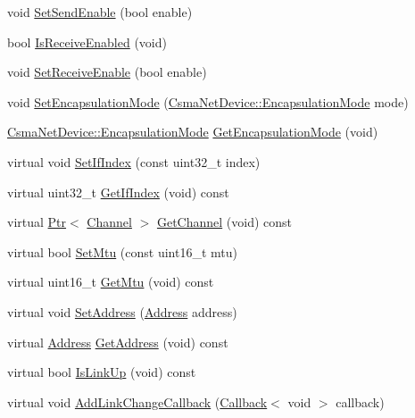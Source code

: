 \begin{DoxyCompactItemize}
\item 
void \hyperlink{classns3_1_1CsmaNetDevice_aa3a93694ca83a26f513008a7d8f36dbe}{Set\+Send\+Enable} (bool enable)
\item 
bool \hyperlink{classns3_1_1CsmaNetDevice_a6a4e8e37d1a78fa176184a1787b47c3a}{Is\+Receive\+Enabled} (void)
\item 
void \hyperlink{classns3_1_1CsmaNetDevice_a2bb51b44d9ef6aa86350c83f059d3f8f}{Set\+Receive\+Enable} (bool enable)
\item 
void \hyperlink{classns3_1_1CsmaNetDevice_abb8187ce567fde1aa17250f38751468b}{Set\+Encapsulation\+Mode} (\hyperlink{classns3_1_1CsmaNetDevice_a176431468055d41f8e879e33a5362cad}{Csma\+Net\+Device\+::\+Encapsulation\+Mode} mode)
\item 
\hyperlink{classns3_1_1CsmaNetDevice_a176431468055d41f8e879e33a5362cad}{Csma\+Net\+Device\+::\+Encapsulation\+Mode} \hyperlink{classns3_1_1CsmaNetDevice_a51819cee730b7c8f68d1ec277a986a8a}{Get\+Encapsulation\+Mode} (void)
\item 
virtual void \hyperlink{classns3_1_1CsmaNetDevice_a469d807eeb90a07795ef29824698b23f}{Set\+If\+Index} (const uint32\+\_\+t index)
\item 
virtual uint32\+\_\+t \hyperlink{classns3_1_1CsmaNetDevice_a0a2ec345a46446edcd4c829980abc837}{Get\+If\+Index} (void) const 
\item 
virtual \hyperlink{classns3_1_1Ptr}{Ptr}$<$ \hyperlink{classns3_1_1Channel}{Channel} $>$ \hyperlink{classns3_1_1CsmaNetDevice_ab4eaccd57e3fc31b49197632bd53933f}{Get\+Channel} (void) const 
\item 
virtual bool \hyperlink{classns3_1_1CsmaNetDevice_a6fe6c073498c02fa0b01c64746f6166b}{Set\+Mtu} (const uint16\+\_\+t mtu)
\item 
virtual uint16\+\_\+t \hyperlink{classns3_1_1CsmaNetDevice_a4c27c177803c2efbea66c14b66babd84}{Get\+Mtu} (void) const 
\item 
virtual void \hyperlink{classns3_1_1CsmaNetDevice_a3e67420f44df00ba880ecc3f361cce2a}{Set\+Address} (\hyperlink{classns3_1_1Address}{Address} address)
\item 
virtual \hyperlink{classns3_1_1Address}{Address} \hyperlink{classns3_1_1CsmaNetDevice_ae3352827049c29ccee336f2c7fb98182}{Get\+Address} (void) const 
\item 
virtual bool \hyperlink{classns3_1_1CsmaNetDevice_a961676d6d97ebdb8605196c96e0d2ef1}{Is\+Link\+Up} (void) const 
\item 
virtual void \hyperlink{classns3_1_1CsmaNetDevice_a9d03e26036a3f29d584baa12bd7e14a5}{Add\+Link\+Change\+Callback} (\hyperlink{classns3_1_1Callback}{Callback}$<$ void $>$ callback)

\end{DoxyCompactItemize}
